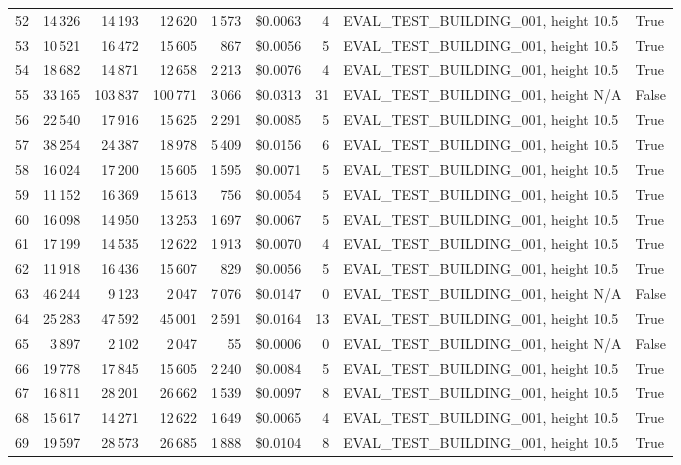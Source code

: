 \documentclass[a4paper,11pt]{article}
\begin{document}
\begin{table}[ht]
\begin{tabular}{r r r r r r r p{3cm} l}
52 & 14\,326 & 14\,193 & 12\,620 & 1\,573 & \$0.0063 & 4 & EVAL\_TEST\_BUILDING\_001, height 10.5 & True \\
53 & 10\,521 & 16\,472 & 15\,605 & 867 & \$0.0056 & 5 & EVAL\_TEST\_BUILDING\_001, height 10.5 & True \\
54 & 18\,682 & 14\,871 & 12\,658 & 2\,213 & \$0.0076 & 4 & EVAL\_TEST\_BUILDING\_001, height 10.5 & True \\
55 & 33\,165 & 103\,837 & 100\,771 & 3\,066 & \$0.0313 & 31 & EVAL\_TEST\_BUILDING\_001, height N/A & False \\
56 & 22\,540 & 17\,916 & 15\,625 & 2\,291 & \$0.0085 & 5 & EVAL\_TEST\_BUILDING\_001, height 10.5 & True \\
57 & 38\,254 & 24\,387 & 18\,978 & 5\,409 & \$0.0156 & 6 & EVAL\_TEST\_BUILDING\_001, height 10.5 & True \\
58 & 16\,024 & 17\,200 & 15\,605 & 1\,595 & \$0.0071 & 5 & EVAL\_TEST\_BUILDING\_001, height 10.5 & True \\
59 & 11\,152 & 16\,369 & 15\,613 & 756 & \$0.0054 & 5 & EVAL\_TEST\_BUILDING\_001, height 10.5 & True \\
60 & 16\,098 & 14\,950 & 13\,253 & 1\,697 & \$0.0067 & 5 & EVAL\_TEST\_BUILDING\_001, height 10.5 & True \\
61 & 17\,199 & 14\,535 & 12\,622 & 1\,913 & \$0.0070 & 4 & EVAL\_TEST\_BUILDING\_001, height 10.5 & True \\
62 & 11\,918 & 16\,436 & 15\,607 & 829 & \$0.0056 & 5 & EVAL\_TEST\_BUILDING\_001, height 10.5 & True \\
63 & 46\,244 & 9\,123 & 2\,047 & 7\,076 & \$0.0147 & 0 & EVAL\_TEST\_BUILDING\_001, height N/A & False \\
64 & 25\,283 & 47\,592 & 45\,001 & 2\,591 & \$0.0164 & 13 & EVAL\_TEST\_BUILDING\_001, height 10.5 & True \\
65 & 3\,897 & 2\,102 & 2\,047 & 55 & \$0.0006 & 0 & EVAL\_TEST\_BUILDING\_001, height N/A & False \\
66 & 19\,778 & 17\,845 & 15\,605 & 2\,240 & \$0.0084 & 5 & EVAL\_TEST\_BUILDING\_001, height 10.5 & True \\
67 & 16\,811 & 28\,201 & 26\,662 & 1\,539 & \$0.0097 & 8 & EVAL\_TEST\_BUILDING\_001, height 10.5 & True \\
68 & 15\,617 & 14\,271 & 12\,622 & 1\,649 & \$0.0065 & 4 & EVAL\_TEST\_BUILDING\_001, height 10.5 & True \\
69 & 19\,597 & 28\,573 & 26\,685 & 1\,888 & \$0.0104 & 8 & EVAL\_TEST\_BUILDING\_001, height 10.5 & True \\

\end{tabular}
\end{table}
\end{document}
